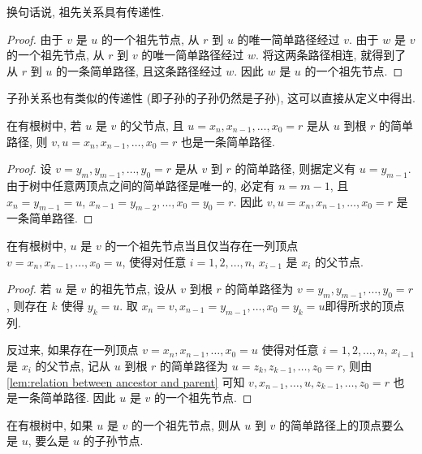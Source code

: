 换句话说, 祖先关系具有传递性.

\begin{proof}
    由于 $v$ 是 $u$ 的一个祖先节点, 从 $r$ 到 $u$ 的唯一简单路径经过 $v$. 由于 $w$ 是 $v$ 的一个祖先节点, 从 $r$ 到 $v$ 的唯一简单路径经过 $w$. 将这两条路径相连, 就得到了从 $r$ 到 $u$ 的一条简单路径, 且这条路径经过 $w$. 因此 $w$ 是 $u$ 的一个祖先节点.
\end{proof}

子孙关系也有类似的传递性 (即子孙的子孙仍然是子孙), 这可以直接从定义中得出.

\begin{lemma}\label{lem:relation between ancestor and parent}
    在有根树中, 若 $u$ 是 $v$ 的父节点, 且 $u=x_n, x_{n-1}, \dots, x_0=r$ 是从 $u$ 到根 $r$ 的简单路径, 则 $v, u=x_n, x_{n-1}, \dots, x_0=r$ 也是一条简单路径.
\end{lemma}

\begin{proof}
    设 $v=y_m, y_{m-1}, \dots, y_0=r$ 是从 $v$ 到 $r$ 的简单路径, 则据定义有 $u=y_{m-1}$. 由于树中任意两顶点之间的简单路径是唯一的, 必定有 $n=m-1$, 且 $x_n=y_{m-1}=u$, $x_{n-1}=y_{m-2}, \dots, x_0=y_0=r$. 因此 $v, u=x_n, x_{n-1}, \dots, x_0=r$ 是一条简单路径.
\end{proof}

\begin{theorem}
    在有根树中, $u$ 是 $v$ 的一个祖先节点当且仅当存在一列顶点 $v=x_n, x_{n-1}, \dots, x_0=u$, 使得对任意 $i=1,2,\dots,n$, $x_{i-1}$ 是 $x_i$ 的父节点.
\end{theorem}

\begin{proof}
    若 $u$ 是 $v$ 的祖先节点, 设从 $v$ 到根 $r$ 的简单路径为 $v=y_m, y_{m-1}, \dots, y_0=r$, 则存在 $k$ 使得 $y_k=u$. 取 $x_n=v, x_{n-1}=y_{m-1}, \dots, x_0=y_k=u$即得所求的顶点列.

    反过来, 如果存在一列顶点 $v=x_n, x_{n-1}, \dots, x_0=u$ 使得对任意 $i=1,2,\dots,n$, $x_{i-1}$ 是 $x_i$ 的父节点, 记从 $u$ 到根 $r$ 的简单路径为 $u=z_k, z_{k-1}, \dots, z_0=r$, 则由\cref{lem:relation between ancestor and parent} 可知 $v, x_{n-1}, \dots, u, z_{k-1}, \dots, z_0=r$ 也是一条简单路径. 因此 $u$ 是 $v$ 的一个祖先节点.
\end{proof}

\begin{lemma}
    在有根树中, 如果 $u$ 是 $v$ 的一个祖先节点, 则从 $u$ 到 $v$ 的简单路径上的顶点要么是 $u$, 要么是 $u$ 的子孙节点.
\end{lemma}

